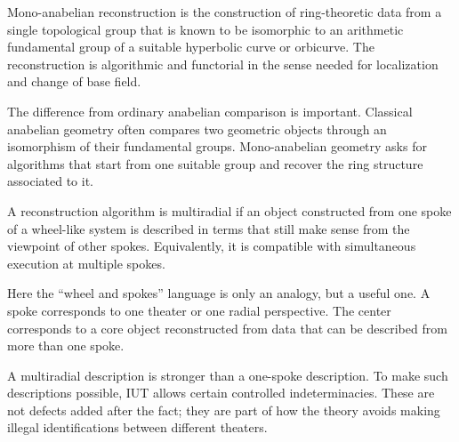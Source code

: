 \begin{definition}
Mono-anabelian reconstruction is the construction of ring-theoretic data from a single topological group that is known to be isomorphic to an arithmetic fundamental group of a suitable hyperbolic curve or orbicurve.  The reconstruction is algorithmic and functorial in the sense needed for localization and change of base field.
\end{definition}

The difference from ordinary anabelian comparison is important.  Classical anabelian geometry often compares two geometric objects through an isomorphism of their fundamental groups.  Mono-anabelian geometry asks for algorithms that start from one suitable group and recover the ring structure associated to it.

\begin{definition}
A reconstruction algorithm is multiradial if an object constructed from one spoke of a wheel-like system is described in terms that still make sense from the viewpoint of other spokes.  Equivalently, it is compatible with simultaneous execution at multiple spokes.
\end{definition}

Here the ``wheel and spokes'' language is only an analogy, but a useful one.  A spoke corresponds to one theater or one radial perspective.  The center corresponds to a core object reconstructed from data that can be described from more than one spoke.

\begin{center}
\end{center}

\begin{remark}
A multiradial description is stronger than a one-spoke description.  To make such descriptions possible, IUT allows certain controlled indeterminacies.  These are not defects added after the fact; they are part of how the theory avoids making illegal identifications between different theaters.
\end{remark}

